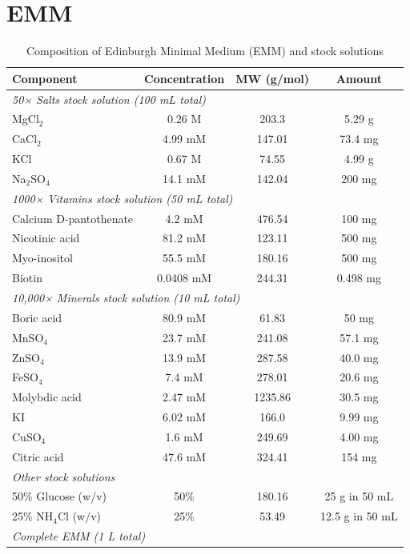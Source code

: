 \section{EMM}
\begin{table}[H]
\centering
\caption{Composition of Edinburgh Minimal Medium (EMM) and stock solutions}
\label{tab:S1_EMM}
\small  %
\begin{tabular}{lccc}
\hline
\textbf{Component} & \textbf{Concentration} & \textbf{MW (g/mol)} & \textbf{Amount} \\
\hline
\multicolumn{4}{l}{\textit{50× Salts stock solution (100 mL total)}} \\
MgCl$_2$ & 0.26 M & 203.3 & 5.29 g \\
CaCl$_2$ & 4.99 mM & 147.01 & 73.4 mg \\
KCl & 0.67 M & 74.55 & 4.99 g \\
Na$_2$SO$_4$ & 14.1 mM & 142.04 & 200 mg \\
\hline
\multicolumn{4}{l}{\textit{1000× Vitamins stock solution (50 mL total)}} \\
Calcium D-pantothenate & 4.2 mM & 476.54 & 100 mg \\
Nicotinic acid & 81.2 mM & 123.11 & 500 mg \\
Myo-inositol & 55.5 mM & 180.16 & 500 mg \\
Biotin & 0.0408 mM & 244.31 & 0.498 mg \\
\hline
\multicolumn{4}{l}{\textit{10,000× Minerals stock solution (10 mL total)}} \\
Boric acid & 80.9 mM & 61.83 & 50 mg \\
MnSO$_4$ & 23.7 mM & 241.08 & 57.1 mg \\
ZnSO$_4$ & 13.9 mM & 287.58 & 40.0 mg \\
FeSO$_4$ & 7.4 mM & 278.01 & 20.6 mg \\
Molybdic acid & 2.47 mM & 1235.86 & 30.5 mg \\
KI & 6.02 mM & 166.0 & 9.99 mg \\
CuSO$_4$ & 1.6 mM & 249.69 & 4.00 mg \\
Citric acid & 47.6 mM & 324.41 & 154 mg \\
\hline
\multicolumn{4}{l}{\textit{Other stock solutions}} \\
50\% Glucose (w/v) & 50\% & 180.16 & 25 g in 50 mL \\
25\% NH$_4$Cl (w/v) & 25\% & 53.49 & 12.5 g in 50 mL \\
\hline
\multicolumn{4}{l}{\textit{Complete EMM (1 L total)}} \\

\end{tabular}
\end{table}
